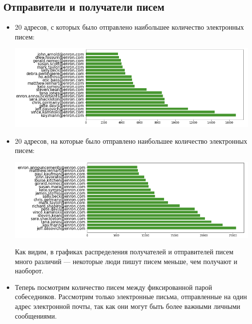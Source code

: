 \subsection{Отправители и получатели писем}

\begin{itemize}
\item 20 адресов, с которых было отправлено наибольшее количество электронных писем:

\begin{center}
\includegraphics[scale=0.5]{pics/enron_most_sent.png}
\end{center}

\item 20 адресов, на которые было отправлено наибольшее количество электронных писем:

\begin{center}
\includegraphics[scale=0.5]{pics/enron_most_recieved.png}
\end{center}

Как видим, в графиках распределения получателей и отправителей писем много различий --- некоторые люди пишут писем меньше, чем получают и наоборот.

\item Теперь посмотрим количество писем между фиксированной парой собеседников. Рассмотрим только электронные письма, отправленные на один адрес электронной почты, так как они могут быть более важными личными сообщениями.


\end{itemize}
